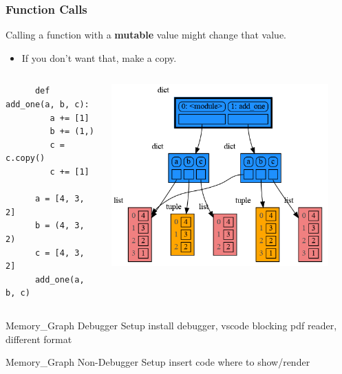 \documentclass[10pt, colorlinks=true, urlcolor=blue]{beamer}
\begin{document}
\begin{frame}[fragile]
\frametitle{Function Calls}
  Calling a function with a \textbf{mutable} value might change that value.
  \begin{itemize}
  \item If you don't want that, make a copy.
  \end{itemize}

  \begin{columns}
    \begin{verbatim}
      def add_one(a, b, c):
         a += [1]
         b += (1,)
         c = c.copy()
         c += [1]
         
      a = [4, 3, 2]
      b = (4, 3, 2)
      c = [4, 3, 2]
      add_one(a, b, c)
    \end{verbatim}
    \begin{center}\includegraphics[width=0.9\textwidth]{figures/function_call.png}\end{center}
  \end{columns}
\end{frame}


\begin{frame}{Memory\_Graph Debugger Setup}
  install
  debugger, vscode
  blocking pdf reader, different format
\end{frame}

\begin{frame}{Memory\_Graph Non-Debugger Setup}
  insert code where to show/render
\end{frame}
\end{document}

